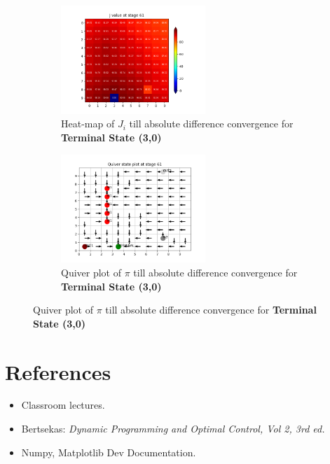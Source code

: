 \begin{figure}[h]
\begin{subfigure}
\centering
\includegraphics[angle=0,width=0.6\textwidth]{hw2/logs/t=3_N=-1/J-heatmap-61.png}
\caption{Heat-map of $J_i$ till absolute difference convergence for \textbf{Terminal State (3,0)}}
\end{subfigure}

\begin{subfigure}
\centering
\includegraphics[angle=0,width=0.6\textwidth]{hw2/logs/t=3_N=-1/quiver-61.png}
\caption{Quiver plot of $\pi$  till absolute difference convergence for \textbf{Terminal State (3,0)}}
\end{subfigure}
\end{figure}
\section{References}
\begin{itemize}
\item Classroom lectures.
\item Bertsekas:\textit{ Dynamic Programming and Optimal Control, Vol 2, 3rd ed.}
\item Numpy, Matplotlib Dev Documentation.
\end{itemize}

